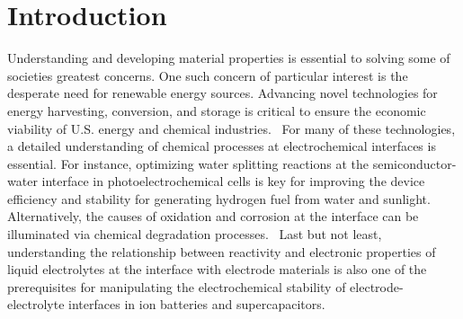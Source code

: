 \chapter{Introduction}

Understanding and developing material properties is essential to solving some of societies greatest concerns. One such concern of particular interest is the desperate need for renewable energy sources.
Advancing novel technologies for energy harvesting, conversion, and storage is critical to ensure the economic viability of U.S. energy and chemical industries.~\cite{eia,renewable} For many of these technologies, a detailed understanding of chemical processes at electrochemical interfaces is essential. For instance, optimizing water splitting reactions at the semiconductor-water interface in photoelectrochemical cells is key for improving the device efficiency and stability for generating hydrogen fuel from water and sunlight.~\cite{mccrory2015} Alternatively, the causes of oxidation and corrosion at the interface can be illuminated via chemical degradation processes.~\cite{huang2019} Last but not least, understanding the relationship between reactivity and electronic properties of liquid electrolytes at the interface with electrode materials is also one of the prerequisites for manipulating the electrochemical stability of electrode-electrolyte interfaces in ion batteries and supercapacitors.~\cite{wang2018}

